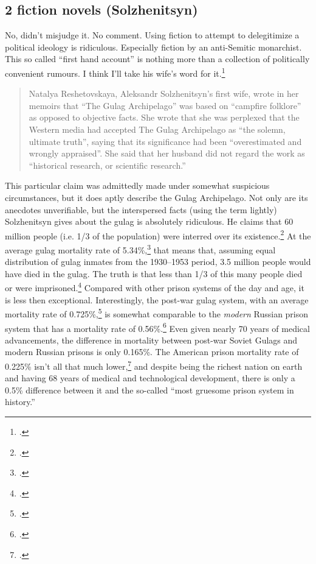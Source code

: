 \subsection{2 fiction novels (Solzhenitsyn)}
No, didn't misjudge it.
No comment.
Using fiction to attempt to delegitimize a political ideology is ridiculous.
Especially fiction by an anti-Semitic monarchist.
This so called ``first hand account'' is nothing more than a collection of politically convenient rumours.
I think I'll take his wife's word for it.\footcite{natalya}
\begin{quote}
    Natalya Reshetovskaya, Aleksandr Solzhenitsyn's first wife, wrote in her memoirs that ``The Gulag Archipelago'' was based on ``campfire folklore'' as opposed to objective facts.
    She wrote that she was perplexed that the Western media had accepted The Gulag Archipelago as ``the solemn, ultimate truth'', saying that its significance had been ``overestimated and wrongly appraised''.
    She said that her husband did not regard the work as ``historical research, or scientific research.''
\end{quote}
This particular claim was admittedly made under somewhat suspicious circumstances, but it does aptly describe the Gulag Archipelago.
Not only are its anecdotes unverifiable, but the interspersed facts (using the term lightly) Solzhenitsyn gives about the gulag is absolutely ridiculous.
He claims that 60 million people (i.e. 1/3 of the population) were interred over its existence.\footcite{solzhenitsyn}
At the average gulag mortality rate of 5.34\%,\footcite{remembering} that means that, assuming equal distribution of gulag inmates from the 1930--1953 period, 3.5 million people would have died in the gulag.
The truth is that less than 1/3 of this many people died or were imprisoned.\footcite{penal-system}
Compared with other prison systems of the day and age, it is less then exceptional.
Interestingly, the post-war gulag system, with an average mortality rate of 0.725\%,\footcite{remembering} is somewhat comparable to the \emph{modern} Russian prison system that has a mortality rate of 0.56\%.\footcite{russian-prison}
Even given nearly 70 years of medical advancements, the difference in mortality between post-war Soviet Gulags and modern Russian prisons is only 0.165\%.
The American prison mortality rate of 0.225\% isn't all that much lower,\footcite{prison-mortality} and despite being the richest nation on earth and having 68 years of medical and technological development, there is only a 0.5\% difference between it and the so-called ``most gruesome prison system in history.''

